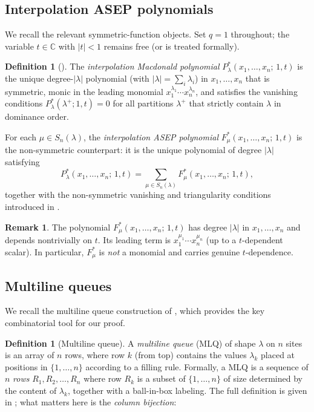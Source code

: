 \documentclass[12pt]{article}
\theoremstyle{definition}
\newtheorem{definition}[theorem]{Definition}
\newtheorem{remark}[theorem]{Remark}
\begin{document}
\subsection{Interpolation ASEP polynomials}

We recall the relevant symmetric-function objects.  Set $q = 1$ throughout; the
variable $t \in \mathbb{C}$ with $|t| < 1$ remains free (or is treated
formally).

\begin{definition}[{\cite{CMW22}}]
The \emph{interpolation Macdonald polynomial} $P^*_\lambda(x_1,\dots,x_n;\,1,t)$
is the unique degree-$|\lambda|$ polynomial (with $|\lambda| = \sum_i \lambda_i$)
in $x_1,\dots,x_n$ that is symmetric, monic in the leading monomial
$x_1^{\lambda_1}\cdots x_n^{\lambda_n}$, and satisfies the vanishing conditions
$P^*_\lambda(\lambda^+; 1, t) = 0$ for all partitions $\lambda^+$ that strictly
contain $\lambda$ in dominance order.

For each $\mu \in S_n(\lambda)$, the \emph{interpolation ASEP polynomial}
$F^*_\mu(x_1,\dots,x_n;\,1,t)$ is the non-symmetric counterpart: it is the
unique polynomial of degree $|\lambda|$ satisfying
\[
  P^*_\lambda(x_1,\dots,x_n;\,1,t) = \sum_{\mu \in S_n(\lambda)} F^*_\mu(x_1,\dots,x_n;\,1,t),
\]
together with the non-symmetric vanishing and triangularity conditions introduced
in \cite{CMW22}.
\end{definition}

\begin{remark}\label{rem:degree}
The polynomial $F^*_\mu(x_1,\dots,x_n;\,1,t)$ has degree $|\lambda|$ in
$x_1,\dots,x_n$ and depends nontrivially on $t$.  Its leading term is
$x_1^{\mu_1}\cdots x_n^{\mu_n}$ (up to a $t$-dependent scalar).  In particular,
$F^*_\mu$ is \emph{not} a monomial and carries genuine $t$-dependence.
\end{remark}

\subsection{Multiline queues}

We recall the multiline queue construction of \cite{CMW22}, which provides the
key combinatorial tool for our proof.

\begin{definition}[Multiline queue]
A \emph{multiline queue} (MLQ) of shape $\lambda$ on $n$ sites is an array of
$n$ rows, where row $k$ (from top) contains the values $\lambda_k$ placed at
positions in $\{1,\dots,n\}$ according to a filling rule.  Formally, a MLQ is
a sequence of $n$ \emph{rows} $R_1, R_2, \dots, R_n$ where row $R_k$ is a
subset of $\{1,\dots,n\}$ of size determined by the content of $\lambda_k$,
together with a ball-in-box labeling.  The full definition is given in
\cite{CMW22}; what matters here is the \emph{column bijection}:
\end{definition}
\end{document}
